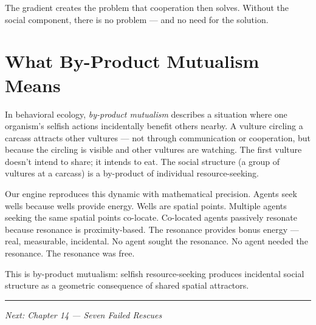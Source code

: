 The gradient creates the problem that cooperation then solves. Without the social component, there is no problem --- and no need for the solution.

\section{What By-Product Mutualism Means}\label{what-by-product-mutualism-means}

In behavioral ecology, \emph{by-product mutualism} describes a situation where one organism's selfish actions incidentally benefit others nearby. A vulture circling a carcass attracts other vultures --- not through communication or cooperation, but because the circling is visible and other vultures are watching. The first vulture doesn't intend to share; it intends to eat. The social structure (a group of vultures at a carcass) is a by-product of individual resource-seeking.

Our engine reproduces this dynamic with mathematical precision. Agents seek wells because wells provide energy. Wells are spatial points. Multiple agents seeking the same spatial points co-locate. Co-located agents passively resonate because resonance is proximity-based. The resonance provides bonus energy --- real, measurable, incidental. No agent sought the resonance. No agent needed the resonance. The resonance was free.

This is by-product mutualism: selfish resource-seeking produces incidental social structure as a geometric consequence of shared spatial attractors.

\begin{center}\rule{0.5\linewidth}{0.5pt}\end{center}

\emph{Next: Chapter 14 --- Seven Failed Rescues}
